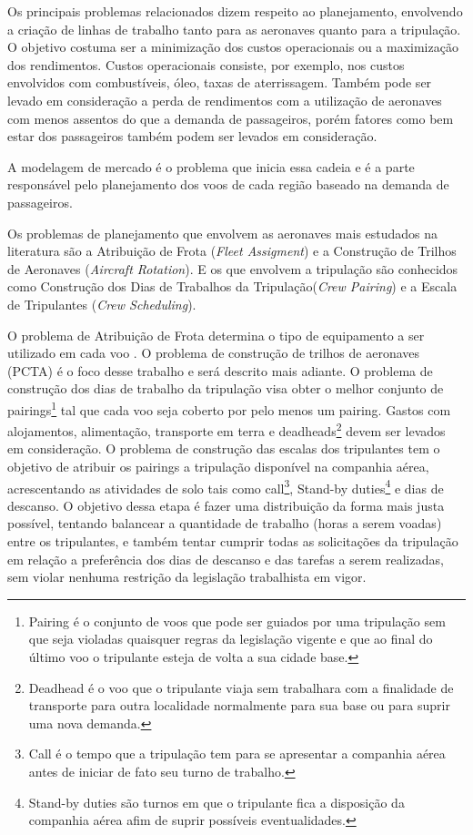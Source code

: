 	Os principais problemas relacionados dizem respeito ao planejamento, envolvendo a criação de linhas de trabalho tanto para as aeronaves quanto para a tripulação. O objetivo costuma ser a minimização dos custos operacionais ou a maximização dos rendimentos. Custos operacionais consiste, por exemplo, nos custos envolvidos com combustíveis, óleo, taxas de aterrissagem. Também pode ser levado em consideração a perda de rendimentos com a utilização de aeronaves com menos assentos do que a demanda de passageiros, porém fatores como bem estar dos passageiros também podem ser levados em consideração.  	
	
	A modelagem de mercado é o problema que inicia essa cadeia e é a parte responsável pelo planejamento dos voos de cada região baseado na demanda de passageiros.
	
	Os problemas de planejamento que envolvem as aeronaves mais estudados na literatura são a Atribuição de Frota (\textit{Fleet Assigment}) e a Construção de Trilhos de Aeronaves (\textit{Aircraft Rotation}). E os que envolvem a tripulação são conhecidos como Construção dos Dias de Trabalhos da Tripulação(\textit{Crew Pairing}) e a Escala de Tripulantes (\textit{Crew Scheduling}).
	  	    
    O problema de Atribuição de Frota determina o tipo de equipamento a ser utilizado em cada voo \cite{pimentel2005}. O problema de construção de trilhos de aeronaves (PCTA) é o foco desse trabalho e será descrito mais adiante. O problema de construção dos dias de trabalho da tripulação visa obter o melhor conjunto de pairings\footnote{Pairing é o conjunto de voos que pode ser guiados por uma tripulação sem que seja violadas quaisquer regras da legislação vigente e que ao final do último voo o tripulante esteja de volta a sua cidade base.} tal que cada voo seja coberto por pelo menos um pairing. Gastos com alojamentos, alimentação, transporte em terra e deadheads\footnote{Deadhead é o voo que o tripulante viaja sem trabalhara com a finalidade de transporte para outra localidade normalmente para sua base ou para suprir uma nova demanda.} devem ser levados em consideração. O problema de construção das escalas dos tripulantes tem o objetivo de atribuir os pairings a tripulação disponível na companhia aérea, acrescentando as atividades de solo tais como call\footnote{Call é o tempo que a tripulação tem para se apresentar a companhia aérea antes de iniciar de fato seu turno de trabalho.}, Stand-by duties\footnote{Stand-by duties são turnos em que o tripulante fica a disposição da companhia aérea afim de suprir possíveis eventualidades.} e dias de descanso. O objetivo dessa etapa é fazer uma distribuição da forma mais justa possível, tentando balancear a quantidade de trabalho (horas a serem voadas) entre os tripulantes, e também tentar cumprir todas as solicitações da tripulação em relação a preferência dos dias de descanso e das tarefas a serem realizadas, sem violar nenhuma restrição da legislação trabalhista em vigor.
    
